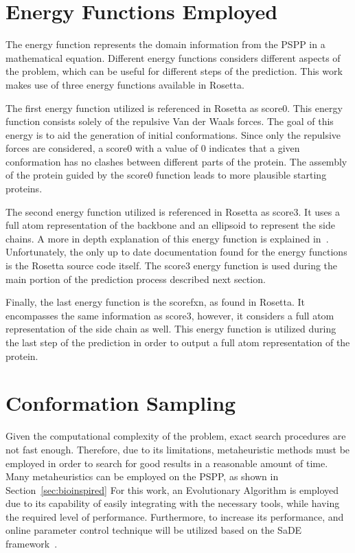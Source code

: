 \section{Energy Functions Employed}
\label{sec:energy-function}

The energy function represents the domain information from the \ac{PSPP} in a
mathematical equation. Different energy functions considers different aspects
of the problem, which can be useful for different steps of the prediction. This
work makes use of three energy functions available in Rosetta.

The first energy function utilized is referenced in Rosetta as score0. This
energy function consists solely of the repulsive Van der Waals forces. The goal
of this energy is to aid the generation of initial conformations. Since only
the repulsive forces are considered, a score0 with a value of $0$ indicates
that a given conformation has no clashes between different parts of the
protein. The assembly of the protein guided by the score0 function leads to
more plausible starting proteins.

The second energy function utilized is referenced in Rosetta as score3. It uses
a full atom representation of the backbone and an ellipsoid to represent the
side chains. A more in depth explanation of this energy function is explained
in~\cite{alford2017rosetta}. Unfortunately, the only up to date documentation
found for the energy functions is the Rosetta source code itself.  The score3
energy function is used during the main portion of the prediction process
described next section.

Finally, the last energy function is the scorefxn, as found in Rosetta. It
encompasses the same information as score3, however, it considers a full atom
representation of the side chain as well. This energy function is utilized
during the last step of the prediction in order to output a full atom
representation of the protein.

\section{Conformation Sampling}
\label{sec:conformation-sampling}

Given the computational complexity of the problem, exact search procedures are
not fast enough. Therefore, due to its limitations,
metaheuristic methods must be employed in order to search for good results
in a reasonable amount of time. Many metaheuristics can be employed
on the \ac{PSPP}, as shown in Section~\ref{sec:bioinspired}
For this work, an Evolutionary Algorithm is employed due to its capability
of easily integrating with the necessary tools, while having the required level
of performance. Furthermore, to increase
its performance, and online parameter control technique will be
utilized based on the \ac{SaDE} framework~\cite{qin2005self,qin2009differential}.

